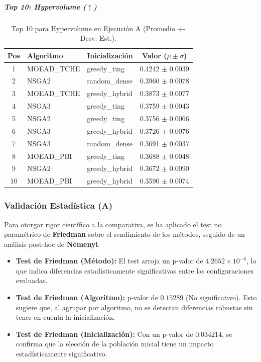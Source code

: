 \documentclass[a4paper,10pt]{article}
\begin{document}
\subparagraph{Top 10: Hypervolume ($\uparrow$)}
\begin{table}[H]
    \centering
    \begin{tabular}{cllc}
        \toprule
        Pos & Algoritmo & Inicialización & Valor ($\mu \pm \sigma$) \\
        \midrule
        1 & MOEAD\_TCHE & greedy\_ting & 0.4242 $\pm$ 0.0039 \\
        2 & NSGA2 & random\_dense & 0.3960 $\pm$ 0.0078 \\
        3 & MOEAD\_TCHE & greedy\_hybrid & 0.3873 $\pm$ 0.0077 \\
        4 & NSGA3 & greedy\_ting & 0.3759 $\pm$ 0.0043 \\
        5 & NSGA2 & greedy\_ting & 0.3756 $\pm$ 0.0066 \\
        6 & NSGA3 & greedy\_hybrid & 0.3726 $\pm$ 0.0076 \\
        7 & NSGA3 & random\_dense & 0.3691 $\pm$ 0.0037 \\
        8 & MOEAD\_PBI & greedy\_ting & 0.3688 $\pm$ 0.0048 \\
        9 & NSGA2 & greedy\_hybrid & 0.3672 $\pm$ 0.0090 \\
        10 & MOEAD\_PBI & greedy\_hybrid & 0.3590 $\pm$ 0.0074 \\
        \bottomrule
    \end{tabular}
    \caption{Top 10 para Hypervolume en Ejecución A (Promedio +- Desv. Est.).}
\end{table}


\subsubsection{Validación Estadística (A)}
Para otorgar rigor científico a la comparativa, se ha aplicado el test no paramétrico de \textbf{Friedman} sobre el rendimiento de los métodos, seguido de un análisis post-hoc de \textbf{Nemenyi}. 

\begin{itemize}
    \item \textbf{Test de Friedman (Método):} El test arroja un p-valor de $4.2652 \times 10^{-6}$, lo que indica diferencias estadísticamente significativas entre las configuraciones evaluadas.
    \item \textbf{Test de Friedman (Algoritmo):} p-valor de $0.15289$ (No significativo). Esto sugiere que, al agrupar por algoritmo, no se detectan diferencias robustas sin tener en cuenta la inicialización.
    \item \textbf{Test de Friedman (Inicialización):} Con un p-valor de $0.034214$, se confirma que la elección de la población inicial tiene un impacto estadísticamente significativo.
\end{itemize}
\end{document}
